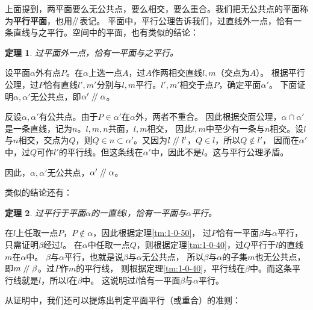 \documentclass[12pt,UTF8]{ctexbook}
\newtheorem{tm}{定理}[section]
\renewcommand\parallel{\mathrel{/\mskip-4mu/}}
\begin{document}
上面提到，两平面要么无公共点，要么相交，要么重合。我们把无公共点的平面称为\textbf{平行平面}，也用$\parallel$表记。
平面中，平行公理告诉我们，过直线外一点，恰有一条直线与之平行。空间中的平面，也有类似的结论：
\begin{tm}
    过平面外一点，恰有一平面与之平行。
\end{tm}\label{tm:1-0-50}
\begin{proof2}
    设平面$\alpha$外有点$P$。在$\alpha$上选一点$A$，过$A$作两相交直线$l,m$（交点为$A$）。
    根据平行公理，过$P$恰有直线$l', m'$分别与$l,m$平行。$l',m'$相交于点$P$，确定平面$\alpha'$。
    下面证明$\alpha,\alpha'$无公共点，即$\alpha'\parallel\alpha$。

    反设$\alpha,\alpha'$有公共点。由于$P\in\alpha'$在$\alpha$外，两者不重合。
    因此根据交面公理，$\alpha \cap \alpha'$是一条直线，记为$n$。$l,m,n$共面，$l,m$相交，
    因此$l,m$中至少有一条与$n$相交。设$l$与$n$相交，交点为$Q$，则$Q\in n\subset\alpha'$。又因为$l\parallel l'$，$Q\in l$，所以$Q\notin l'$，
    因而在$\alpha'$中，过$Q$可作$l'$的平行线。但这条线在$\alpha'$中，因此不是$l$。这与平行公理矛盾。
        
    因此，$\alpha,\alpha'$无公共点，$\alpha'\parallel\alpha$。
\end{proof2}

类似的结论还有：

\begin{tm}\label{tm:1-0-60}
    过平行于平面$\alpha$的一直线$l$，恰有一平面与$\alpha$平行。
\end{tm}
\begin{proof2}
在$l$上任取一点$P$，$P\notin \alpha$，因此根据定理\ref{tm:1-0-50}，
过$P$恰有一平面$\beta$与$\alpha$平行，只需证明$\beta$经过$l$。
在$\alpha$中任取一点$Q$，则根据定理\ref{tm:1-0-40}，过$Q$平行于$l$的直线$m$在$\alpha$中。
$\beta$与$\alpha$平行，也就是说$\beta$与$\alpha$无公共点，
所以$\beta$与$\alpha$的子集$m$也无公共点，即$m\parallel \beta$。过$P$作$m$的平行线，
则根据定理\ref{tm:1-0-40}，平行线在$\beta$中。而这条平行线就是$l$，所以$l$在$\beta$中。
这说明过$l$恰有一平面$\beta$与$\alpha$平行。
\end{proof2}

从证明中，我们还可以提炼出判定平面平行（或重合）的准则：
\end{document}
